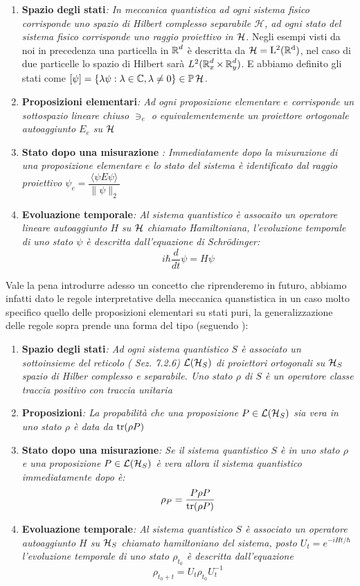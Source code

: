 \begin{enumerate}
    \item \textbf{Spazio degli stati}\emph{: In meccanica quantistica ad ogni sistema fisico corrisponde uno spazio di Hilbert complesso separabile $\mathcal{H}$, ad ogni stato del sistema fisico corrisponde uno raggio proiettivo in $\operatorname{\mathcal{H}}$. } Negli esempi visti da noi in precedenza una particella in $\operatorname{\mathbb{R}}^d$ è descritta da $\operatorname{\mathcal{H}} = \operatorname{L^2(\mathbb{R}^d)}$, nel caso di due particelle lo spazio di Hilbert sarà $L^2(\operatorname{\mathbb{R}}^d_x \times \operatorname{\mathbb{R}}^d_y)$. E abbiamo definito gli stati come $[ \psi] = \{ \lambda \psi : \lambda \in \mathbb{C}, \lambda \neq 0\} \in \mathbb{P}\operatorname{\mathcal{H}}$.
    \item \textbf{Proposizioni elementari}\emph{: Ad ogni proposizione elementare $e$ corrisponde un sottospazio lineare chiuso $\ni_e$ o equivalementemente un proiettore ortogonale autoaggiunto $E_e$ su $\operatorname{\mathcal{H}}$}
    \item \textbf{Stato dopo una misurazione} \emph{: Immediatamente dopo la misurazione di una proposizione elementare $e$ lo stato del sistema è identificato dal raggio proiettivo $\psi_e = \dfrac{\langle \psi E \psi \rangle}{\|\psi\|_2}$}
    \item \textbf{Evoluazione temporale}\emph{: Al sistema quantistico è assocaito un operatore lineare autoaggiunto $H$ su $\operatorname{\mathcal{H}}$ chiamato Hamiltoniana, l'evoluzione temporale di uno stato $\psi$ è descritta dall'equazione di Schrödinger: $$i \hbar \dfrac{d}{dt} \psi = H \psi$$}
\end{enumerate}
Vale la pena introdurre adesso un concetto che riprenderemo in futuro, abbiamo infatti dato le regole interpretative della meccanica quanstistica in un caso molto specifico quello delle proposizioni elementari su stati puri, la generalizzazione delle regole sopra prende una forma del tipo (seguendo \cite{Mor}):
\begin{enumerate}
    \item \textbf{Spazio degli stati}\emph{: Ad ogni sistema quantistico $S$ è associato un sottoinsieme del reticolo (\cite{Mor} Sez. 7.2.6) $\mathcal{L}(\operatorname{\mathcal{H}}_S)$ di proiettori ortogonali su $\operatorname{\mathcal{H}}_S$ spazio di Hilber complesso e separabile. Uno stato $\rho$ di $S$ è un operatore classe traccia positivo con traccia unitaria}
    \item \textbf{Proposizioni}\emph{: La propabilità che una proposizione $P \in \mathcal{L}(\operatorname{\mathcal{H}}_S)$ sia vera in uno stato $\rho$ è data da $\tr(\rho P)$}
    \item \textbf{Stato dopo una misurazione}\emph{: Se il sistema quantistico $S$ è in uno stato $\rho$ e una proposizione $P \in \mathcal{L}(\operatorname{\mathcal{H}}_S)$ è vera allora il sistema quantistico immediatamente dopo è: $$\rho_P = \dfrac{P \rho P}{\tr(\rho P)}$$}
    \item \textbf{Evoluazione temporale}\emph{: Al sistema quantistico $S$ è associato un operatore autoaggiunto $H$ su $\operatorname{\mathcal{H}}_S$ chiamato hamiltoniano del sistema, posto $U_t = e^{-iHt/\hbar}$ l'evoluzione temporale di uno stato $\rho_{t_0}$ è descritta dall'equazione $$\rho_{t_0 + t} = U_t \rho_{t_0} U_t^{-1}$$}
\end{enumerate}
